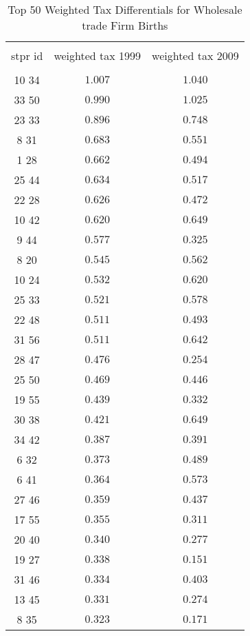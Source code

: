 
\begin{table}[!htbp] \centering 
  \caption{Top 50 Weighted Tax Differentials for  Wholesale trade Firm Births} 
  \label{} 
\tiny 
\begin{tabular}{@{\extracolsep{5pt}} ccc} 
\\[-1.8ex]\hline 
\hline \\[-1.8ex] 
stpr id & weighted tax 1999 & weighted tax 2009 \\ 
\hline \\[-1.8ex] 
10 34  & $1.007$ & $1.040$ \\ 
33 50  & $0.990$ & $1.025$ \\ 
23 33  & $0.896$ & $0.748$ \\ 
8 31  & $0.683$ & $0.551$ \\ 
1 28  & $0.662$ & $0.494$ \\ 
25 44  & $0.634$ & $0.517$ \\ 
22 28  & $0.626$ & $0.472$ \\ 
10 42  & $0.620$ & $0.649$ \\ 
9 44  & $0.577$ & $0.325$ \\ 
8 20  & $0.545$ & $0.562$ \\ 
10 24  & $0.532$ & $0.620$ \\ 
25 33  & $0.521$ & $0.578$ \\ 
22 48  & $0.511$ & $0.493$ \\ 
31 56  & $0.511$ & $0.642$ \\ 
28 47  & $0.476$ & $0.254$ \\ 
25 50  & $0.469$ & $0.446$ \\ 
19 55  & $0.439$ & $0.332$ \\ 
30 38  & $0.421$ & $0.649$ \\ 
34 42  & $0.387$ & $0.391$ \\ 
6 32  & $0.373$ & $0.489$ \\ 
6 41  & $0.364$ & $0.573$ \\ 
27 46  & $0.359$ & $0.437$ \\ 
17 55  & $0.355$ & $0.311$ \\ 
20 40  & $0.340$ & $0.277$ \\ 
19 27  & $0.338$ & $0.151$ \\ 
31 46  & $0.334$ & $0.403$ \\ 
13 45  & $0.331$ & $0.274$ \\ 
8 35  & $0.323$ & $0.171$ \\ 

\end{tabular}
\end{table}
